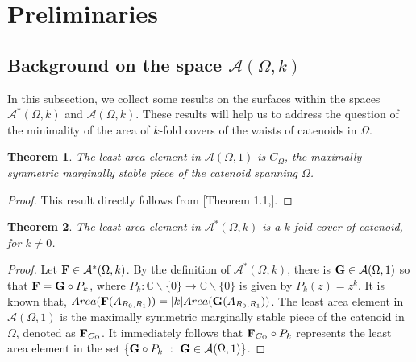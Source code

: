 \documentclass[11pt]{amsart}
\numberwithin{equation}{section}
\theoremstyle{theorem}
\newtheorem{theorem}{Theorem}[section]
\theoremstyle{definition}
\numberwithin{equation}{section}
\begin{document}
\section{Preliminaries}
\subsection{Background on the space $\mathcal{A}(\Omega,k)$}
In this subsection, we collect some results on the surfaces within the spaces $\mathcal{A}^*(\Omega,k)$ and $\mathcal{A}(\Omega,k)$. These results will help us to address the question of the minimality of the area of $k$-fold covers of the waists of catenoids in $\Omega$.

\begin{theorem} \label{thm: A^* least area}
    The least area element in $\mathcal{A}(\Omega , 1)$ is $C_{\Omega}$, the maximally symmetric marginally stable piece of the catenoid spanning $\Omega$.
\end{theorem}
\begin{proof}
   This result directly follows from [Theorem 1.1,\cite{bernstein2014variational}].
     
\end{proof}

\begin{theorem} \label{thm: A^* least area}
    The least area element in $\mathcal{A}^*(\Omega ,k)$ is a $k$-fold cover of catenoid, for $k \neq 0$.
\end{theorem}
\begin{proof}
    Let $\bold{F} \in \mathcal{A}^*(\Omega ,k)$. By the definition of  $\mathcal{A}^*(\Omega ,k) $, there is $\bold{G} \in \mathcal{A}(\Omega ,1)$ so that $\bold{F} = \bold{G} \circ P_k$, where $P_k : \mathbb{C} \backslash \{ 0\} \rightarrow \mathbb{C} \backslash \{ 0\}$ is given by $P_k(z)=z^k$. It is known that, $Area (\bold{F}(A_{R_0,R_1}))=\vert k\vert Area (\bold{G}(A_{R_0,R_1}))$. The least area element in $\mathcal{A}(\Omega ,1)$ is the maximally symmetric marginally stable piece of the catenoid in $\Omega$, denoted as $\bold{F}_{C_{\Omega}}$. It immediately follows that $\bold{F}_{C_{\Omega}} \circ P_k$ represents the least area element in the set $\{ \bold{G} \circ P_k\ :\ \bold{G} \in \mathcal{A}(\Omega ,1) \}$. 
\end{proof}
\end{document}
